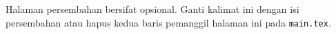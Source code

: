 Halaman persembahan bersifat opsional. Ganti kalimat ini dengan isi persembahan atau hapus kedua baris pemanggil halaman ini pada \texttt{main.tex}.
